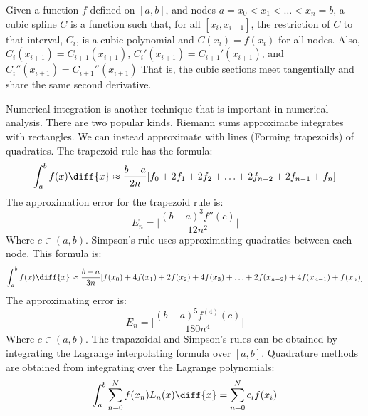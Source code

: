         \begin{definition}
            Given a function $f$ defined on $[a,b]$, and
            nodes $a=x_{0}<x_{1}<\hdots<x_{n}=b$, a
            cubic spline $C$ is a function such that,
            for all $[x_{i},x_{i+1}]$, the restriction
            of $C$ to that interval, $C_{i}$,
            is a cubic polynomial and
            $C(x_{i})=f(x_{i})$ for all nodes. Also,
            $C_{i}(x_{i+1})=C_{i+1}(x_{i+1})$,
            $C_{i}'(x_{i+1})=C_{i+1}'(x_{i+1})$, and
            $C_{i}''(x_{i+1})=C_{i+1}''(x_{i+1})$
            That is, the cubic sections meet
            tangentially and share the same
            second derivative.
        \end{definition}
        Numerical integration is another technique that is
        important in numerical analysis. There are two popular
        kinds. Riemann sums approximate integrates with
        rectangles. We can instead approximate with
        lines (Forming trapezoids) of quadratics.
        The trapezoid rule has the formula:
        \begin{equation*}
            \int_{a}^{b}f(x)\diff{x}\approx
            \frac{b-a}{2n}[f_{0}+2f_{1}+2f_{2}+
            \hdots+2f_{n-2}+2f_{n-1}+f_{n}]
        \end{equation*}
        The approximation error for the trapezoid rule is:
        \begin{equation*}
            E_{n}=\Big|\frac{(b-a)^{3}f''(c)}{12n^{2}}\Big|
        \end{equation*}
        Where $c\in(a,b)$. Simpson's rule uses approximating
        quadratics between each node. This formula is:
        \begin{equation*}
            \int_{a}^{b}f(x)\diff{x}\approx
            \frac{b-a}{3n}[f(x_{0})+4f(x_{1})+2f(x_{2})
            +4f(x_{3})+\hdots+2f(x_{n-2})+4f(x_{n-1})+f(x_{n})]
        \end{equation*}
        The approximating error is:
        \begin{equation*}
            E_{n}=\Big|\frac{(b-a)^{5}f^{(4)}(c)}{180n^{4}}\Big|
        \end{equation*}
        Where $c\in(a,b)$. The trapazoidal and Simpson's rules
        can be obtained by integrating the Lagrange
        interpolating formula over
        $[a,b]$. Quadrature methods are obtained from
        integrating over the Lagrange polynomials:
        \begin{equation*}
            \int_{a}^{b}\sum_{n=0}^{N}f(x_{n})L_{n}(x)\diff{x}
            =\sum_{n=0}^{N}c_{i}f(x_{i})
        \end{equation*}

